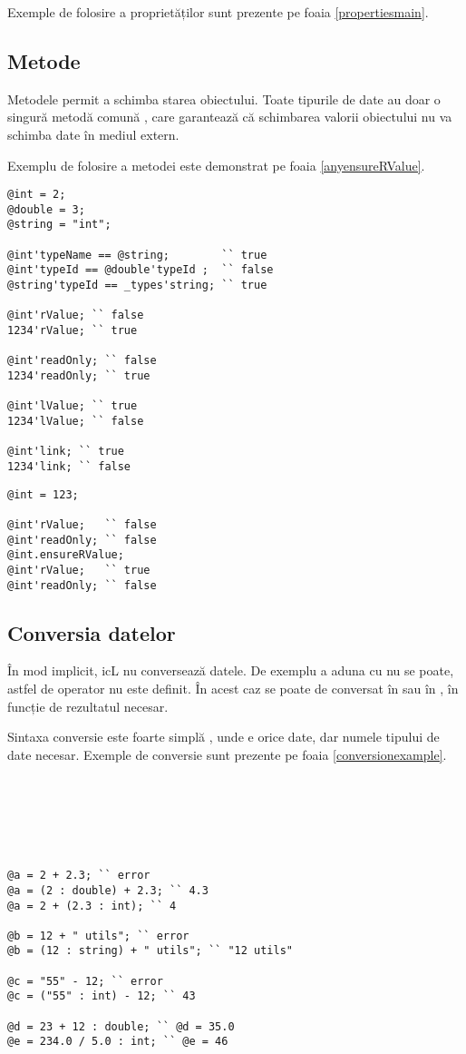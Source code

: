 Exemple de folosire a proprietăților sunt prezente pe foaia \ref{propertiesmain}.

\subsection{Metode}

Metodele permit a schimba starea obiectului. Toate tipurile de date au doar o singură metodă comună , care garantează că schimbarea valorii obiectului nu va schimba date în mediul extern.

Exemplu de folosire a metodei  este demonstrat pe foaia \ref{anyensureRValue}.

\begin{lstlisting}[caption=Proprietăți, label=propertiesmain]
@int = 2;
@double = 3;
@string = "int";

@int'typeName == @string;		 `` true
@int'typeId == @double'typeId ;	 `` false
@string'typeId == _types'string; `` true

@int'rValue; `` false
1234'rValue; `` true

@int'readOnly; `` false
1234'readOnly; `` true

@int'lValue; `` true
1234'lValue; `` false

@int'link; `` true
1234'link; `` false
\end{lstlisting}


\begin{lstlisting}[caption=Metoda any.ensureRValue, label=anyensureRValue]
@int = 123;

@int'rValue;   `` false
@int'readOnly; `` false
@int.ensureRValue;
@int'rValue;   `` true
@int'readOnly; `` false
\end{lstlisting}

\subsection{Conversia datelor}

În mod implicit, icL nu conversează datele. De exemplu a aduna \integer{} cu \double{} nu se poate, astfel de operator nu este definit. În acest caz se poate de conversat \integer{} în \double{} sau \double{} în \integer{}, în funcție de rezultatul necesar.

Sintaxa conversie este foarte simplă , unde  e orice date, dar  numele tipului de date necesar. Exemple de conversie sunt prezente pe foaia \ref{conversionexample}.

\

\

\

\begin{lstlisting}[caption=Exemple de conversie, label=conversionexample]
@a = 2 + 2.3; `` error
@a = (2 : double) + 2.3; `` 4.3
@a = 2 + (2.3 : int); `` 4

@b = 12 + " utils"; `` error
@b = (12 : string) + " utils"; `` "12 utils"

@c = "55" - 12; `` error
@c = ("55" : int) - 12; `` 43

@d = 23 + 12 : double; `` @d = 35.0
@e = 234.0 / 5.0 : int; `` @e = 46
\end{lstlisting}
